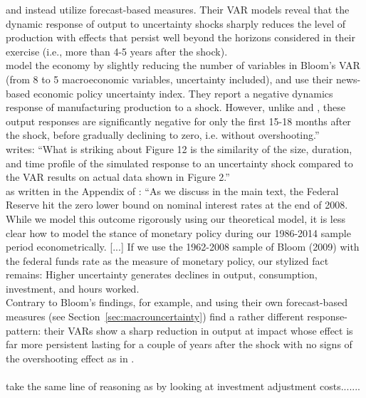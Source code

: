 \documentclass[a4paper,11pt,listof=nochaptergap,oneside,pointednumbers,bibtotoc,bigheadings,liststotoc,hidelinks]{scrbook}
\theoremstyle{mysatz}
\theoremstyle{mydefinition}
\theoremstyle{mytheorem}
\theoremstyle{mybemerkung}
\begin{document}
	\citet{juradoetal:15} and \citet{bachmannetal:13} instead utilize forecast-based measures. Their VAR models reveal that the dynamic response of output to uncertainty shocks sharply reduces the level of production with effects that persist well beyond the horizons considered in their exercise (i.e., more than 4-5 years after the shock).\\
	\citet{bakeretal:15} model the economy by slightly reducing the number of variables in Bloom's VAR (from 8 to 5 macroeconomic variables, uncertainty included), and use their news-based economic policy uncertainty index. They report a negative dynamics response of manufacturing production to a shock. However, unlike \citet{juradoetal:15} and \citet{bachmannetal:13}, these output responses are significantly negative for only the first 15-18 months after the shock, before gradually declining to zero, i.e. without overshooting.''
\\
\citet[p. 651]{bloom:09} writes: ``What is striking about Figure 12 is the similarity of the size, duration, and time profile of the simulated response to an uncertainty shock compared to the VAR results on actual data shown in Figure 2.''
\\
as written in the Appendix of \citet[p. 5]{basuandbundick:17}: ``As we discuss in the main text, the Federal Reserve hit the zero lower bound on nominal interest rates at the end of 2008. While we model this outcome rigorously using our theoretical model, it is less clear how to model the stance of monetary policy during our 1986-2014 sample period econometrically. [...] If we use the 1962-2008 sample of Bloom (2009) with the federal funds rate as the measure of monetary policy, our stylized fact remains: Higher uncertainty generates declines in output, consumption, investment, and hours worked.
\\

Contrary to Bloom's findings, for example, \citet{juradoetal:15} and \citet{bachmannetal:13} using their own forecast-based measures (see Section~\ref{sec:macrouncertainty}) find a rather different response-pattern: their VARs show a sharp reduction in output at impact whose effect is far more persistent lasting for a couple of years after the shock with no signs of the overshooting effect as in \citet{bloom:09}.\\
\\
\citet{bachmannetal:13} take the same line of reasoning as \citet{bloom:09} by looking at investment adjustment costs.......
\\
\\
\end{document}
